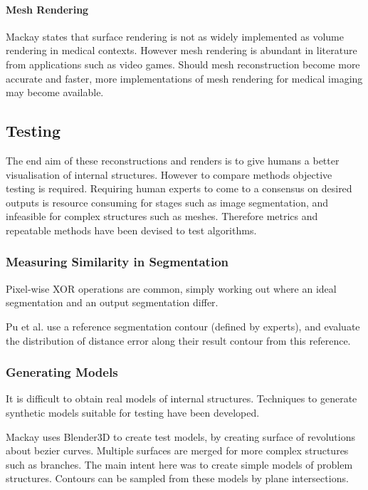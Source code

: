 \documentclass[11p, titlepage]{article}
\begin{document}
\paragraph{Mesh Rendering}

Mackay \cite{mackay2019robust} states that surface rendering is not as widely implemented as volume rendering in medical contexts. However mesh rendering is abundant in literature from applications such as video games. Should mesh reconstruction become more accurate and faster, more implementations of mesh rendering for medical imaging may become available.

\subsection{Testing}

The end aim of these reconstructions and renders is to give humans a better visualisation of internal structures. However to compare methods objective testing is required. Requiring human experts to come to a consensus on desired outputs is resource consuming for stages such as image segmentation, and infeasible for complex structures such as meshes. Therefore metrics and repeatable methods have been devised to test algorithms.

\subsubsection{Measuring Similarity in Segmentation}

Pixel-wise XOR operations are common, simply working out where an ideal segmentation and an output segmentation differ.

Pu et al. \cite{pu2008adaptive} use a reference segmentation contour (defined by experts), and evaluate the distribution of distance error along their result contour from this reference. 

\subsubsection{Generating Models}

It is difficult to obtain real models of internal structures. Techniques to generate synthetic models suitable for testing have been developed.

Mackay \cite{mackay2019robust} uses Blender3D to create test models, by creating surface of revolutions about bezier curves. Multiple surfaces are merged for more complex structures such as branches. The main intent here was to create simple models of problem structures. Contours can be sampled from these models by plane intersections.
\end{document}
